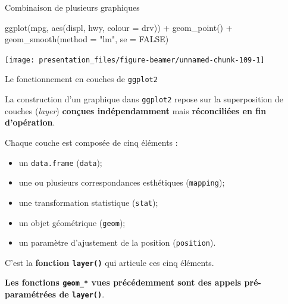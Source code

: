 \documentclass[12pt,handout,ignorenonframetext,]{beamer}
\newenvironment{Shaded}{}{}
\newcommand{\KeywordTok}[1]{\textcolor[rgb]{0.00,0.00,1.00}{#1}}
\newcommand{\DataTypeTok}[1]{#1}
\newcommand{\StringTok}[1]{\textcolor[rgb]{0.00,0.50,0.50}{#1}}
\newcommand{\OtherTok}[1]{\textcolor[rgb]{1.00,0.25,0.00}{#1}}
\newcommand{\OperatorTok}[1]{#1}
\newcommand{\NormalTok}[1]{#1}
\providecommand{\tightlist}{%
  \setlength{\itemsep}{0pt}\setlength{\parskip}{0pt}}
\renewenvironment{Shaded}{\begin{snugshade}}{\end{snugshade}}
\begin{document}
\begin{frame}[fragile]{Combinaison de plusieurs graphiques}

\footnotesize \center

\begin{Shaded}
\begin{Highlighting}[]
\KeywordTok{ggplot}\NormalTok{(mpg, }\KeywordTok{aes}\NormalTok{(displ, hwy, }\DataTypeTok{colour =}\NormalTok{ drv)) }\OperatorTok{+}
\StringTok{  }\KeywordTok{geom_point}\NormalTok{() }\OperatorTok{+}\StringTok{ }\KeywordTok{geom_smooth}\NormalTok{(}\DataTypeTok{method =} \StringTok{"lm"}\NormalTok{, }\DataTypeTok{se =} \OtherTok{FALSE}\NormalTok{)}
\end{Highlighting}
\end{Shaded}

\texttt{[image: presentation\_files/figure-beamer/unnamed-chunk-109-1]}

\end{frame}

\begin{frame}[fragile]{\large Le fonctionnement en \og couches \fg{} de
\texttt{ggplot2}}

La construction d'un graphique dans \texttt{ggplot2} repose sur la
superposition de couches (\emph{layer}) \textbf{conçues indépendamment}
mais \textbf{réconciliées en fin d'opération}.

\pause Chaque couche est composée de cinq éléments :

\begin{itemize}
\tightlist
\item
  un \texttt{data.frame} (\texttt{data});
\item
  une ou plusieurs correspondances esthétiques (\texttt{mapping});
\item
  une transformation statistique (\texttt{stat});
\item
  un objet géométrique (\texttt{geom});
\item
  un paramètre d'ajustement de la position (\texttt{position}).
\end{itemize}

C'est la \textbf{fonction \texttt{layer()}} qui articule ces cinq
éléments.

\pause 

\textbf{Les fonctions \texttt{geom\_*} vues précédemment sont des appels
pré-paramétrées de \texttt{layer()}}.

\end{frame}
\end{document}
